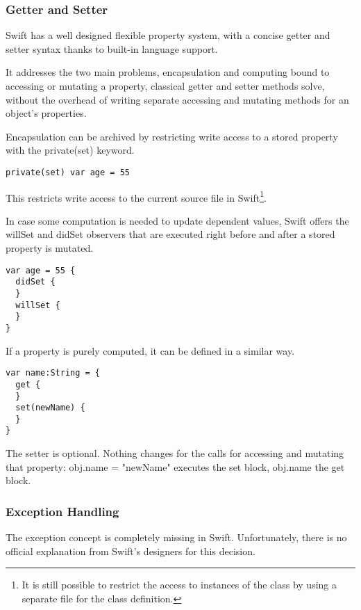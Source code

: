 \subsubsection{Getter and Setter}

Swift has a well designed flexible property system, with a concise getter and setter syntax thanks to built-in language support. 

It addresses the two main problems, encapsulation and computing bound to accessing or mutating a property, classical getter and setter methods solve, without the overhead of writing separate accessing and mutating methods for an object's properties.

Encapsulation can be archived by restricting write access to a stored property with the private(set) keyword.

\begin{lstlisting}[frame=none]
private(set) var age = 55
\end{lstlisting}

This restricts write access to the current source file in Swift\footnote{It is still possible to restrict the access to instances of the class by using a separate file for the class definition.}.

In case some computation is needed to update dependent values, Swift offers the willSet and didSet observers that are executed right before and after a stored property is mutated.

\begin{lstlisting}[frame=none]
var age = 55 {
  didSet {
  }
  willSet {
  }
}
\end{lstlisting}

If a property is purely computed, it can be defined in a similar way.

\begin{lstlisting}[frame=none]
var name:String = {
  get {
  }
  set(newName) {
  }
}
\end{lstlisting}

The setter is optional. Nothing changes for the calls for accessing and mutating that property: obj.name = "newName" executes the set block, obj.name the get block.

\subsubsection{Exception Handling}

The exception concept is completely missing in Swift. Unfortunately, there is no official explanation from Swift's designers for this decision.

